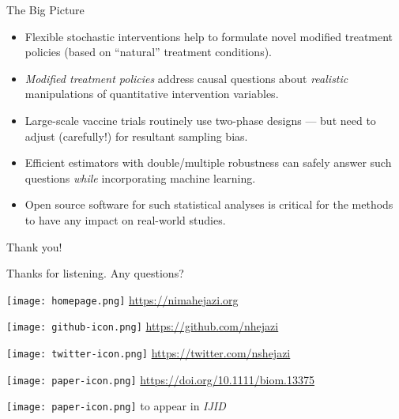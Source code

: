 \documentclass{beamer}
\begin{document}


\begin{frame}[c]{The Big Picture}

\begin{center}
\begin{itemize}
  \itemsep8pt
  \item Flexible stochastic interventions help to formulate novel modified
    treatment policies (based on ``natural'' treatment conditions).
  \item \textit{Modified treatment policies} address causal questions about
    \textit{realistic} manipulations of quantitative intervention variables.
  \item Large-scale vaccine trials routinely use two-phase designs --- but need
    to adjust (carefully!) for resultant sampling bias.
  \item Efficient estimators with double/multiple robustness can safely answer
    such questions \textit{while} incorporating machine learning.
  \item Open source software for such statistical analyses is critical for the
    methods to have any impact on real-world studies.
\end{itemize}
\end{center}

\note{
}

\end{frame}


\begin{frame}[c]{Thank you!}

\Large{Thanks for listening. Any questions?}

\vspace{2mm}
\texttt{[image: homepage.png]} \url{https://nimahejazi.org}

\vspace{2mm}
\texttt{[image: github-icon.png]}
  \url{https://github.com/nhejazi}

\vspace{2mm}
\texttt{[image: twitter-icon.png]}
  \url{https://twitter.com/nshejazi}

\vspace{2mm}
\texttt{[image: paper-icon.png]}
  \url{https://doi.org/10.1111/biom.13375}

\vspace{2mm}
\texttt{[image: paper-icon.png]}
  \citet{hejazi2023stochastic} to appear in \textit{IJID}

\end{frame}
\end{document}
